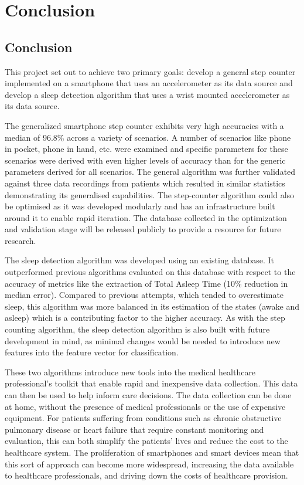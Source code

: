 \part{Conclusion}
\chapter{Conclusion}

This project set out to achieve two primary goals: develop a general step counter implemented on a smartphone that uses an accelerometer as its data source and develop a sleep detection algorithm that uses a wrist mounted accelerometer as its data source. 

The generalized smartphone step counter exhibits very high accuracies with a median of 96.8\% across a variety of scenarios. A number of scenarios like phone in pocket, phone in hand, etc. were examined and specific parameters for these scenarios were derived with even higher levels of accuracy than for the generic parameters derived for all scenarios. The general algorithm was further validated against three data recordings from patients which resulted in similar statistics demonstrating its generalised capabilities. The step-counter algorithm could also be optimised as it was developed modularly and has an infrastructure built around it to enable rapid iteration. The database collected in the optimization and validation stage will be released publicly to provide a resource for future research.

The sleep detection algorithm was developed using an existing database. It outperformed previous algorithms evaluated on this database with respect to the accuracy of metrics like the extraction of Total Asleep Time (10\% reduction in median error). Compared to previous attempts, which tended to overestimate sleep, this algorithm was more balanced in its estimation of the states (awake and asleep) which is a contributing factor to the higher accuracy. As with the step counting algorithm, the sleep detection algorithm is also built with future development in mind, as minimal changes would be needed to introduce new features into the feature vector for classification. 

These two algorithms introduce new tools into the medical healthcare professional's toolkit that enable rapid and inexpensive data collection. This data can then be used to help inform care decisions. The data collection can be done at home, without the presence of medical professionals or the use of expensive equipment. For patients suffering from conditions such as chronic obstructive pulmonary disease or heart failure that require constant monitoring and evaluation, this can both simplify the patients' lives and reduce the cost to the healthcare system. The proliferation of smartphones and smart devices mean that this sort of approach can become more widespread, increasing the data available to healthcare professionals, and driving down the costs of healthcare provision.